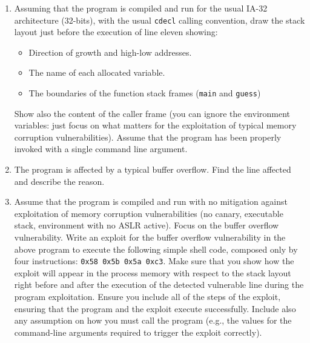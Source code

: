 \begin{enumerate}
    \item Assuming that the program is compiled and run for the usual IA-32 architecture (32-bits), with the usual \texttt{cdecl} calling convention, draw the stack layout just before the execution of line eleven showing:
        \begin{itemize}
            \item Direction of growth and high-low addresses.
            \item The name of each allocated variable. 
            \item The boundaries of the function stack frames (\texttt{main} and \texttt{guess})
        \end{itemize}
        Show also the content of the caller frame (you can ignore the environment variables: just focus on what matters for the exploitation of typical memory corruption vulnerabilities).
        Assume that the program has been properly invoked with a single command line argument.
    \item The program is affected by a typical buffer overflow. 
        Find the line affected and describe the reason. 
    \item Assume that the program is compiled and run with no mitigation against exploitation of memory corruption vulnerabilities (no canary, executable stack, environment with no ASLR active).
        Focus on the buffer overflow vulnerability. 
        Write an exploit for the buffer overflow vulnerability in the above program to execute the following simple shell code, composed only by four instructions: \texttt{0x58 0x5b 0x5a 0xc3}.
        Make sure that you show how the exploit will appear in the process memory with respect to the stack layout right before and after the execution of the detected vulnerable line during the program exploitation.
        Ensure you include all of the steps of the exploit, ensuring that the program and the exploit execute successfully. 
        Include also any assumption on how you must call the program (e.g., the values for the command-line arguments required to trigger the exploit correctly).
\end{enumerate}

